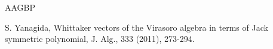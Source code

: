 \documentclass[12pt, a4paper]{amsart}
\newcommand{\C}{\mathbb{C}}
\theoremstyle{Theorem}
\theoremstyle{Theorem}
\numberwithin{equation}{section}
\begin{document}
\begin{thebibliography}{AAGBP}


S. Yanagida, Whittaker vectors of the Virasoro algebra in terms of Jack symmetric polynomial,
J. Alg., 333 (2011), 273-294.






\end{thebibliography}
\end{document}
